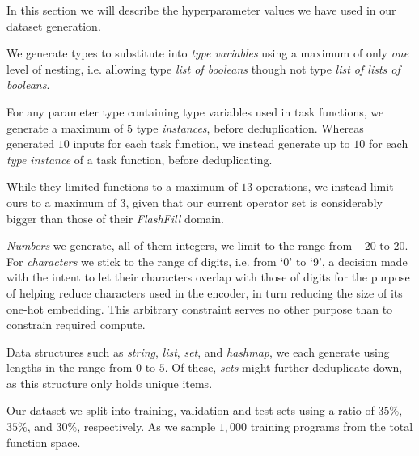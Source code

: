 \documentclass{article}
\begin{document}
In this section we will describe the hyperparameter values we have used in our dataset generation.

We generate types to substitute into \emph{type variables} using a maximum of only \emph{one} level of nesting,
i.e. allowing type \emph{list of booleans} though not type \emph{list of lists of booleans}.

For any parameter type containing type variables used in task functions,
we generate a maximum of $5$ type \emph{instances}, before deduplication.
Whereas \citet{nsps} generated $10$ inputs for each task function,
we instead generate up to $10$ for each \emph{type instance} of a task function, before deduplicating.

While they limited functions to a maximum of $13$ operations,
we instead limit ours to a maximum of $3$,
given that our current operator set is considerably bigger than those of their \emph{FlashFill} domain.

\emph{Numbers} we generate, all of them integers,
we limit to the range from $-20$ to $20$.
For \emph{characters} we stick to the range of digits, i.e. from `0' to `9',
a decision made with the intent to let their characters overlap
with those of digits for the purpose of helping reduce characters used in the encoder,
in turn reducing the size of its one-hot embedding.
This arbitrary constraint serves no other purpose than to constrain required compute.

Data structures such as \emph{string}, \emph{list}, \emph{set}, and \emph{hashmap},
we each generate using lengths in the range from $0$ to $5$.
Of these, \emph{sets} might further deduplicate down,
as this structure only holds unique items.

Our dataset we split into training, validation and test sets
using a ratio of $35\%$, $35\%$, and $30\%$, respectively.
As \citep{nsps} we sample $1,000$ training programs from the total function space.

\end{document}
